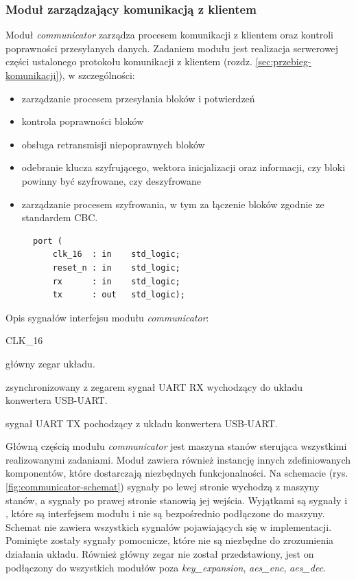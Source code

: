 \subsubsection{Moduł zarządzający komunikacją z klientem}
Moduł \textit{communicator} zarządza procesem komunikacji z klientem oraz kontroli poprawności przesyłanych danych. Zadaniem modułu jest realizacja serwerowej części ustalonego protokołu komunikacji z klientem (rozdz. \ref{sec:przebieg-komunikacji}), w szczególności:
\begin{itemize}[noitemsep, nolistsep]
\item zarządzanie procesem przesyłania bloków i potwierdzeń
\item kontrola poprawności bloków
\item obsługa retransmisji niepoprawnych bloków
\item odebranie klucza szyfrującego, wektora inicjalizacji oraz informacji, czy bloki powinny być szyfrowane, czy deszyfrowane
\item zarządzanie procesem szyfrowania, w tym za łączenie bloków zgodnie ze standardem CBC.
\end{itemize}

\begin{figure}[!h]
\begin{lstlisting}[style=vhdl, captionpos=b, caption={\textit{communicator} -- interfejs modułu}]
port (
	clk_16  : in    std_logic;
	reset_n : in    std_logic;
	rx      : in    std_logic;
	tx      : out   std_logic);
\end{lstlisting}
\end{figure}

Opis sygnałów interfejsu modułu \textit{communicator}:
\begin{interface}{CLK\_16}
	\item[\insignal{CLK\_16}] główny zegar układu.
	\item[\insignal{RX}] zsynchronizowany z zegarem  sygnał UART RX wychodzący do układu konwertera USB-UART.
	\item[\outsignal{TX}] sygnał UART TX pochodzący z układu konwertera USB-UART.
\end{interface}

Główną częścią modułu \textit{communicator} jest maszyna stanów sterująca wszystkimi realizowanymi zadaniami. Moduł zawiera również instancję innych zdefiniowanych komponentów, które dostarczają niezbędnych funkcjonalności. Na schemacie (rys. \ref{fig:communicator-schemat}) sygnały po lewej stronie wychodzą z maszyny stanów, a sygnały po prawej stronie stanowią jej wejścia. Wyjątkami są sygnały  i , które są interfejsem modułu i nie są bezpośrednio podłączone do maszyny. Schemat nie zawiera wszystkich sygnałów pojawiających się w implementacji. Pominięte zostały sygnały pomocnicze, które nie są niezbędne do zrozumienia działania układu. Również główny zegar nie został przedstawiony, jest on podłączony do wszystkich modułów poza \textit{key\_expansion}, \textit{aes\_enc}, \textit{aes\_dec}.

